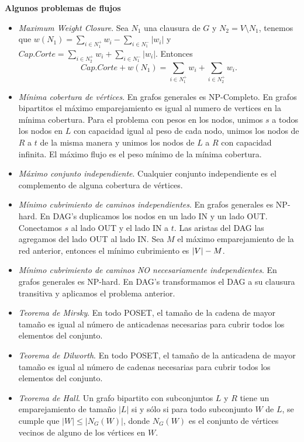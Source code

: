 \documentclass[10pt,spanish,mexico]{article}
\numberwithin{equation}{section}
\newcommand{\pa}[1]{\left( #1 \right)}
\begin{document}
\begin{multicols}{2}
\textbf{Algunos problemas de flujos}
\begin{itemize}
    \item \textit{Maximum Weight Closure}. Sea $N_1$ una clausura de $G$ y $N_2 = V \setminus N_1$, tenemos que $w\pa{N_1} = \sum_{i \in N_1^+} w_i - \sum_{i \in N_1^-} |w_i|$ y $Cap.Corte = \sum_{i \in N_2^+} w_i + \sum_{i \in N_1^-} |w_i|$. Entonces
    $$Cap.Corte + w(N_1) = \sum_{i \in N_1^+} w_i + \sum_{i \in N_2^+} w_i.$$
    \item \textit{Mínima cobertura de vértices}. En grafos generales es NP-Completo. En grafos bipartitos el máximo emparejamiento es igual al numero de vertices en la mínima cobertura. Para el problema con pesos en los nodos, unimos $s$ a todos los nodos en $L$ con capacidad igual al peso de cada nodo, unimos los nodos de $R$ a $t$ de la misma manera y unimos los nodos de $L$ a $R$ con capacidad infinita. El máximo flujo es el peso mínimo de la mínima cobertura.
    \item \textit{Máximo conjunto independiente}. Cualquier conjunto independiente es el complemento de alguna cobertura de vértices.
    \item \textit{Mínimo cubrimiento de caminos independientes}. En grafos generales es NP-hard. En DAG's duplicamos los nodos en un lado IN y un lado OUT. Conectamos $s$ al lado OUT y el lado IN a $t$. Las aristas del DAG las agregamos del lado OUT al lado IN. Sea $M$ el máximo emparejamiento de la red anterior, entonces el mínimo cubrimiento es $\abs{V} - M$.
    \item \textit{Mínimo cubrimiento de caminos NO necesariamente independientes}. En grafos generales es NP-hard. En DAG's transformamos el DAG a su clausura transitiva y aplicamos el problema anterior.
    \item \textit{Teorema de Mirsky}. En todo POSET, el tamaño de la cadena de mayor tamaño es igual al número de anticadenas necesarias para cubrir todos los elementos del conjunto.
    \item \textit{Teorema de Dilworth}. En todo POSET, el tamaño de la anticadena de mayor tamaño es igual al número de cadenas necesarias para cubrir todos los elementos del conjunto.
    \item \textit{Teorema de Hall}. Un grafo bipartito con subconjuntos $L$ y $R$ tiene un emparejamiento de tamaño $|L|$ si y sólo si para todo subconjunto $W$ de $L$, se cumple que $|W| \leq |N_G(W)|$, donde $N_G(W)$ es el conjunto de vértices vecinos de alguno de los vértices en $W$.
\end{itemize}


\end{multicols}
\end{document}
